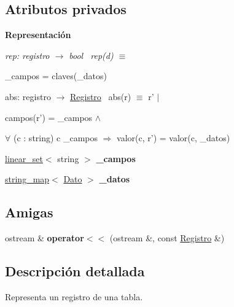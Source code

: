 \subsection*{Atributos privados}
\begin{Indent}{\bf Representación}\par
{\em rep\+: registro $\to$ bool~\newline
rep(d) $\equiv$
\begin{DoxyItemize}
\item \+\_\+campos = claves(\+\_\+datos)
\end{DoxyItemize}

abs\+: registro $\to$ \hyperlink{classRegistro}{Registro}~\newline
abs(r) $\equiv$ r' $|$
\begin{DoxyItemize}
\item campos(r') = \+\_\+campos $\land$
\item $\forall$ (c \+: string) c  \+\_\+campos $\Rightarrow$ valor(c, r') = valor(c, \+\_\+datos) 
\end{DoxyItemize}}\begin{DoxyCompactItemize}
\item 
\hypertarget{classRegistro_ad6c12d81cb20086a4642f4b85fe8063b}{\hyperlink{classlinear__set}{linear\+\_\+set}$<$ string $>$ {\bfseries \+\_\+campos}}\label{classRegistro_ad6c12d81cb20086a4642f4b85fe8063b}

\item 
\hypertarget{classRegistro_aa23f2dcc0afcca1c5c00b5272f4c1b20}{\hyperlink{classstring__map}{string\+\_\+map}$<$ \hyperlink{classDato}{Dato} $>$ {\bfseries \+\_\+datos}}\label{classRegistro_aa23f2dcc0afcca1c5c00b5272f4c1b20}

\end{DoxyCompactItemize}
\end{Indent}
\subsection*{Amigas}
\begin{DoxyCompactItemize}
\item 
\hypertarget{classRegistro_a66788288d92ef16b5a3aab86ae6d87fc}{ostream \& {\bfseries operator$<$$<$} (ostream \&, const \hyperlink{classRegistro}{Registro} \&)}\label{classRegistro_a66788288d92ef16b5a3aab86ae6d87fc}

\end{DoxyCompactItemize}


\subsection{Descripción detallada}
Representa un registro de una tabla. 

